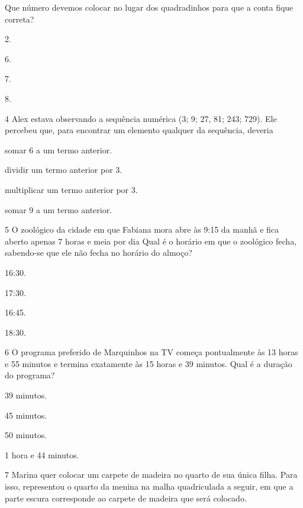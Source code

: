 Que número devemos colocar no lugar dos quadradinhos para que a conta
fique correta?

\begin{escolha}
\item
  2.
\item
  6.
\item
  7.
\item
  8.
\end{escolha}


\num{4} Alex estava observando a sequência numérica (3; 9; 27, 81; 243; 729).
Ele percebeu que, para encontrar um elemento qualquer da sequência,
deveria

\begin{escolha}
\item
  somar 6 a um termo anterior.
\item
  dividir um termo anterior por 3.
\item
  multiplicar um termo anterior por 3.
\item
  somar 9 a um termo anterior.
\end{escolha}


\num{5} O zoológico da cidade em que Fabiana mora abre às 9:15 da manhã e fica
aberto apenas 7 horas e meia por dia Qual é o horário em que o zoológico
fecha, sabendo-se que ele não fecha no horário do almoço?

\begin{escolha}
\item
  16:30.
\item
  17:30.
\item
  16:45.
\item
  18:30.
\end{escolha}


\num{6} O programa preferido de Marquinhos na TV começa pontualmente às 13
horas e 55 minutos e termina exatamente às 15 horas e 39 minutos. Qual é a
duração do programa?

\begin{escolha}
\item
  39 minutos.
\item
  45 minutos.
\item
  50 minutos.
\item
  1 hora e 44 minutos.
\end{escolha}


\num{7} Marina quer colocar um carpete de madeira no quarto de sua única filha.
Para isso, representou o quarto da menina na malha quadriculada a seguir, em que a parte escura corresponde ao carpete de madeira que será
colocado.

